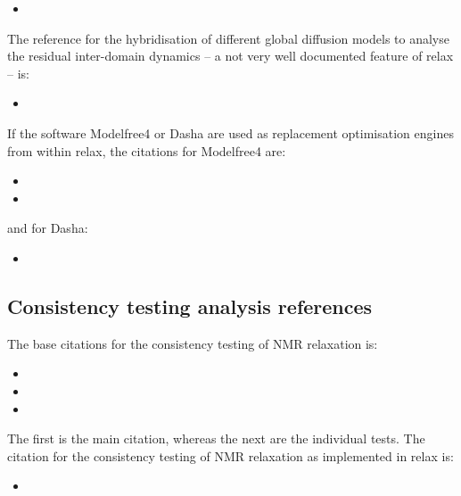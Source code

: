 \begin{itemize}
\item {}
\end{itemize}

The reference for the hybridisation of different global diffusion models to analyse the residual inter-domain dynamics -- a not very well documented feature of relax -- is:

\begin{itemize}
\item {}
\end{itemize}

If the software Modelfree4 or Dasha are used as replacement optimisation engines from within relax, the citations for Modelfree4 are:

\begin{itemize}
\item {}
\item {}
\end{itemize}

and for Dasha:

\begin{itemize}
\item {}
\end{itemize}



\subsection*{Consistency testing analysis references}

The base citations for the consistency testing of NMR relaxation is:

\begin{itemize}
\item {}
\item {}
\item {}
\end{itemize}

The first is the main citation, whereas the next are the individual tests.  The citation for the consistency testing of NMR relaxation as implemented in relax is:

\begin{itemize}
\item {}
\end{itemize}


